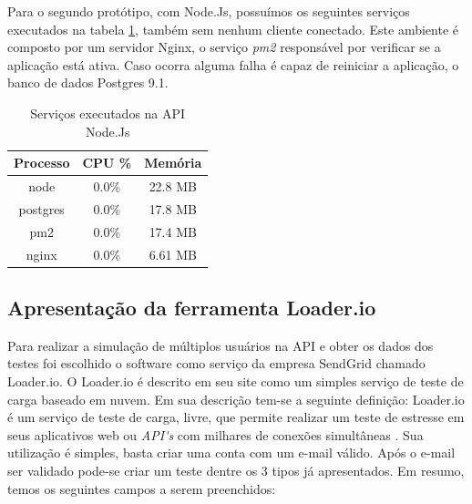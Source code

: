   Para o segundo protótipo, com Node.Js, possuímos os seguintes serviços executados na tabela \ref{tab:services-in-api-node},
  também sem nenhum cliente conectado. Este ambiente é composto por um servidor Nginx, o serviço \textit{pm2} responsável por
  verificar se a aplicação está ativa. Caso ocorra alguma falha é capaz de reiniciar a aplicação,
  o banco de dados Postgres 9.1.

   \begin{table}[H]
    \centering
    \footnotesize
    \setlength{\abovecaptionskip}{0pt}
    \setlength{\belowcaptionskip}{0pt}
    \caption[Serviços executados na API Node]{Serviços executados na API Node.Js}
    \label{tab:services-in-api-node}
    \begin{tabular}{c|c|c}
      \hline \hline
      Processo  & 	CPU \% &	Memória \\
      \hline \hline
      node &		0.0\% &		22.8 MB \\
      postgres &	0.0\% &		17.8 MB \\
      pm2 &		0.0\% &		17.4 MB \\
      nginx &		0.0\% &		6.61 MB \\
      \hline \hline
    \end{tabular}
  \end{table}

\subsection{Apresentação da ferramenta Loader.io}

  Para realizar a simulação de múltiplos usuários na \ac{API} e obter os dados dos testes foi
  escolhido o software como serviço da empresa SendGrid chamado Loader.io. O Loader.io é descrito em seu site
   como um simples serviço de teste de carga baseado em nuvem. Em sua descrição tem-se a seguinte
  definição: Loader.io é um serviço de teste de carga, livre, que permite realizar um teste de estresse em
  seus aplicativos web ou \textit{API\'{}s} com milhares de conexões simultâneas \cite{loaderio}.
  Sua utilização é simples, basta criar uma conta com um e-mail válido. Após o e-mail ser validado pode-se
  criar um teste dentre os 3 tipos já apresentados. Em resumo, temos os seguintes campos a serem preenchidos:

